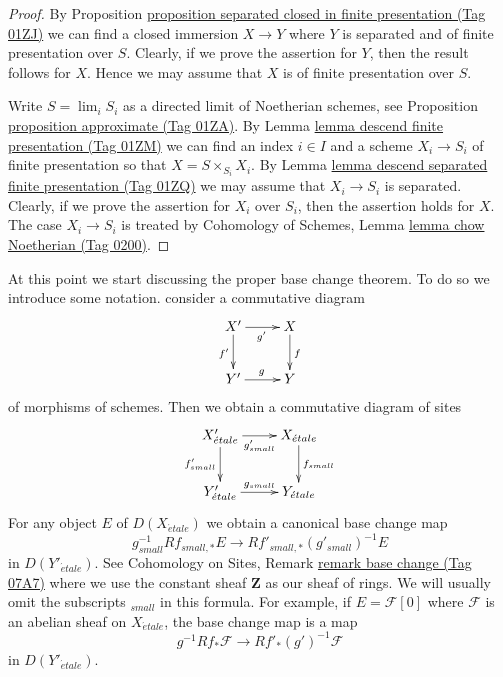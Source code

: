 \documentclass{amsart}
\theoremstyle{plain}
\theoremstyle{definition}
\theoremstyle{remark}
\numberwithin{equation}{subsection}
\def\lim{\mathop{\mathrm{lim}}\nolimits}
\def\etale{{\acute{e}tale}}
\begin{document}
\begin{proof}
By Proposition \href{https://stacks.math.columbia.edu/tag/01ZJ}{proposition separated closed in finite presentation (Tag 01ZJ)}
we can find a closed immersion $X \to Y$ where $Y$ is separated
and of finite presentation over $S$. Clearly, if we prove the assertion
for $Y$, then the result follows for $X$. Hence we may assume that
$X$ is of finite presentation over $S$.

\medskip\noindent
Write $S = \lim_i S_i$ as a directed limit of Noetherian schemes, see
Proposition \href{https://stacks.math.columbia.edu/tag/01ZA}{proposition approximate (Tag 01ZA)}. By
Lemma \href{https://stacks.math.columbia.edu/tag/01ZM}{lemma descend finite presentation (Tag 01ZM)} we can
find an index $i \in I$ and a scheme $X_i \to S_i$ of finite presentation
so that $X = S \times_{S_i} X_i$.
By Lemma \href{https://stacks.math.columbia.edu/tag/01ZQ}{lemma descend separated finite presentation (Tag 01ZQ)}
we may assume that $X_i \to S_i$ is separated.
Clearly, if we prove the assertion for
$X_i$ over $S_i$, then the assertion holds for $X$. The case
$X_i \to S_i$ is treated by
Cohomology of Schemes, Lemma \href{https://stacks.math.columbia.edu/tag/0200}{lemma chow Noetherian (Tag 0200)}.
\end{proof}


\noindent
At this point we start discussing the proper base change theorem.
To do so we introduce some notation. consider a commutative diagram
\begin{equation}
\label{equation-base-change-diagram}
\vcenter{
\xymatrix{
X' \ar[r]_{g'} \ar[d]_{f'} & X \ar[d]^f \\
Y' \ar[r]^g & Y
}
}
\end{equation}
of morphisms of schemes. Then we obtain a commutative diagram of sites
$$
\xymatrix{
X'_\etale \ar[r]_{g'_{small}} \ar[d]_{f'_{small}} &
X_\etale \ar[d]^{f_{small}} \\
Y'_\etale \ar[r]^{g_{small}} &
Y_\etale
}
$$
For any object $E$ of $D(X_\etale)$ we obtain a canonical base change map
\begin{equation}
\label{equation-base-change}
g_{small}^{-1}Rf_{small, *}E \longrightarrow Rf'_{small, *}(g'_{small})^{-1}E
\end{equation}
in $D(Y'_\etale)$. See Cohomology on Sites, Remark
\href{https://stacks.math.columbia.edu/tag/07A7}{remark base change (Tag 07A7)} where we use the constant
sheaf $\mathbf{Z}$ as our sheaf of rings.
We will usually omit the subscripts ${}_{small}$ in this formula.
For example, if $E = \mathcal{F}[0]$ where $\mathcal{F}$ is an abelian
sheaf on $X_\etale$, the base change map is a map
\begin{equation}
\label{equation-base-change-sheaf}
g^{-1}Rf_*\mathcal{F} \longrightarrow Rf'_*(g')^{-1}\mathcal{F}
\end{equation}
in $D(Y'_\etale)$.
\end{document}
